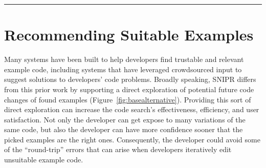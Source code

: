% 
% 
 
\fancybreak{\pfbreakdisplay}

\section{Recommending Suitable Examples}
\label{sec:codesearch}

Many systems have been built to help developers find trustable and relevant example code, including systems that have leveraged crowdsourced input to suggest solutions to developers' code problems. Broadly speaking, \uppercase{SnipR} differs from this prior work by supporting a direct exploration of potential future code changes of found examples (Figure~\ref{fig:basealternative}). Providing this sort of direct exploration can increase the code search's effectiveness, efficiency, and user satisfaction. Not only the developer can get expose to many variations of the same code, but also the developer can have more confidence sooner that the picked examples are the right ones. Consequently, the developer could avoid some of the ``round-trip'' errors that can arise when developers iteratively edit unsuitable example code.

